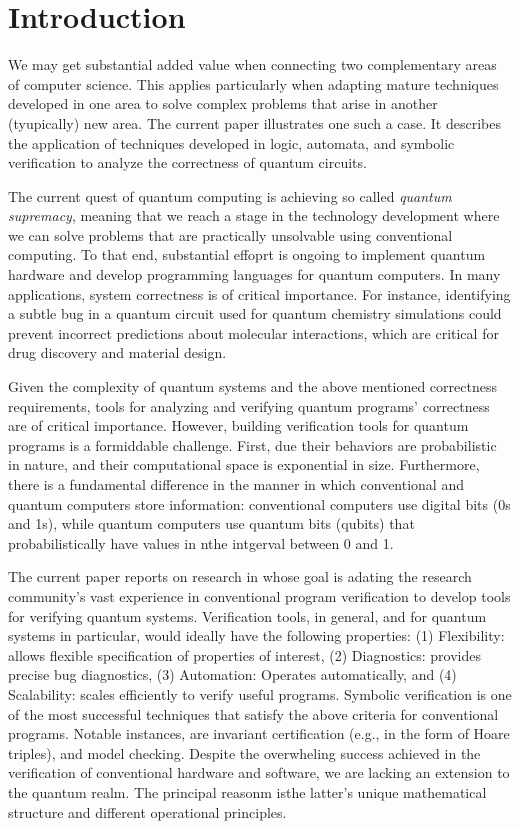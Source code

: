 \section{Introduction}
\label{introduction:section}
We may get substantial  added value when connecting two complementary areas of computer science.
%
This applies particularly when adapting mature techniques developed in one area to solve complex problems that arise in another (tyupically) new area.
%
The current paper illustrates one such a case. 
%
It describes the application of techniques developed in logic, automata, and symbolic verification to analyze the correctness of quantum circuits.

The current quest of quantum computing is achieving  so called {\it quantum supremacy}, meaning that we reach a stage in the technology development
where we can   solve problems that are practically unsolvable using conventional computing.
%
To that end, substantial effoprt is ongoing to implement quantum hardware and develop programming languages for quantum computers.
%
In many applications, system correctness is of critical importance.
%
For instance, identifying a subtle bug in a quantum circuit used for quantum chemistry simulations could prevent incorrect predictions about molecular interactions, which are critical for drug discovery and material design. 
%



Given the complexity of quantum systems and the above mentioned correctness requirements, tools for analyzing and verifying quantum programs' correctness are of critical importance.
%
However, building verification tools for quantum programs is a formiddable challenge.
%
First,  due their behaviors are probabilistic in nature, and their computational space is exponential in size.     
%
Furthermore, there is a fundamental difference in the manner in which conventional and quantum computers store information: conventional computers use digital bits (0s and 1s), while quantum computers use  quantum bits (qubits) that probabilistically have values in nthe intgerval between 0 and 1.

The current paper reports on research in whose goal is adating the research community's vast experience in conventional program verification to develop tools for verifying quantum systems.
%
Verification tools, in general, and for quantum systems in particular, would ideally have the following properties: (1) Flexibility: allows flexible specification of properties of interest, (2) Diagnostics: provides precise bug diagnostics, (3) Automation:
Operates automatically, and (4) Scalability: scales efficiently to verify useful programs.
%
Symbolic verification is one of the most successful techniques that satisfy the above criteria for conventional programs.
%
Notable instances, are invariant certification (e.g., in the form of Hoare triples), and model checking.
%
Despite the overwheling success achieved in the verification of conventional hardware and software,  we are lacking an extension to the quantum realm.
%
The principal reasonm isthe latter's unique mathematical structure and different operational principles.                          
                                                                               
